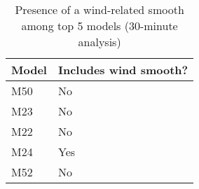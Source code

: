 \begin{table}

\caption{\label{tab:export-wind-smooth-presence-30min}Presence of a wind-related smooth among top 5 models (30-minute analysis)}
\centering
\begin{tabular}[t]{ll}
\toprule
Model & Includes wind smooth?\\
\midrule
M50 & No\\
M23 & No\\
M22 & No\\
M24 & Yes\\
M52 & No\\
\bottomrule
\end{tabular}
\end{table}

